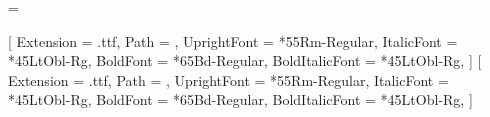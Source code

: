 
\ifluatex
	
	={\unifullfontpath}   %
		
		\usepackage[no-math]{fontspec}
		\setmainfont{QTCasual}
		
		\renewcommand\familydefault\sfdefault %
		\usepackage[italic, symbolgreek]{mathastext} %
		\renewcommand\familydefault\rmdefault %
		
	\else{}    %
		
		\usepackage[no-math]{fontspec} 
		\setmainfont{UniversforUniS}[
		Extension      = .ttf,
		Path           = {\unifontspath},
		UprightFont    = *55Rm-Regular,
		ItalicFont     = *45LtObl-Rg,
		BoldFont       = *65Bd-Regular,
		BoldItalicFont = *45LtObl-Rg,
		]
		\setsansfont{UniversforUniS}[
		Extension      = .ttf,
		Path           = {\unifontspath},
		UprightFont    = *55Rm-Regular,
		ItalicFont     = *45LtObl-Rg,
		BoldFont       = *65Bd-Regular,
		BoldItalicFont = *45LtObl-Rg,
		]
		\renewcommand\familydefault\sfdefault %
		\usepackage[italic, symbolgreek]{mathastext} %
		\renewcommand\familydefault\rmdefault %
	\fi

\else
	\usepackage[T1]{fontenc} %
	\usepackage[scale=1]{tgheros}
	\renewcommand\familydefault\sfdefault %
	\usepackage[italic, symbolgreek]{mathastext} %
\fi


\usepackage{setspace} %

\setlength{\parindent}{0pt} %
\setlength{\parskip}{7pt} %




